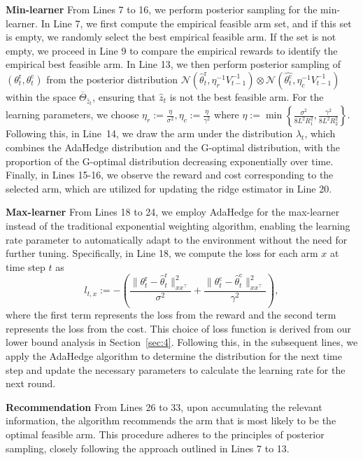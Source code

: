 \documentclass[accepted]{uai2025} %
\theoremstyle{plain}
\theoremstyle{definition}
\theoremstyle{remark}
\newcommand{\thetac}{\theta^{\mathrm{c}}}
\newcommand{\thetar}{\theta^{\mathrm{r}}}
\newcommand{\cbr}[1]{\left\{#1\right\}}
\begin{document}
\textbf{Min-learner}
From Lines 7 to 16, we perform posterior sampling for the min-learner. In Line 7, we first compute the empirical feasible arm set, and if this set is empty, we randomly select the best empirical feasible arm. If the set is not empty, we proceed in Line 9 to compare the empirical rewards to identify the empirical best feasible arm. In Line 13, we then perform posterior sampling of $(\thetar_t, \thetac_t)$ from the posterior distribution $\mathcal{N}(\hat{\theta}^{\mathrm{r}}_t, \eta_r^{-1} V_{t-1}^{-1}) \otimes \mathcal{N}(\hat{\thetac_t}, \eta_c^{-1} V_{t-1}^{-1})$ within the space $\overline{\Theta}_{\hat{z}_t}$, ensuring that $\hat{z}_t$ is not the best feasible arm. For the learning parameters, we choose $\eta_r:=\frac{\eta}{\sigma^2},\eta_c:=\frac{\eta}{\gamma^2}$ where $\eta:=\min \cbr{\frac{\sigma^2}{8L^2R_1^2},\frac{\gamma^2}{8L^2R_2^2}}.$
Following this, in Line~14, we draw the arm under the distribution $\lambda_t$, which combines the AdaHedge distribution and the G-optimal distribution, with the proportion of the G-optimal distribution decreasing exponentially over time. Finally, in Lines 15-16, we observe the reward and cost corresponding to the selected arm, which are utilized for updating the ridge estimator in Line 20.

\textbf{Max-learner}
From Lines 18 to 24, we employ AdaHedge for the max-learner instead of the traditional exponential weighting algorithm, enabling the learning rate parameter to automatically adapt to the environment without the need for further tuning. Specifically, in Line 18, we compute the loss for each arm \( x \) at time step \( t \) as 
$$
l_{t, x} := -\left(\frac{\lVert \thetar_t - \hat{\theta}^{\mathrm{r}}_t \rVert^2_{x x^\top}}{\sigma^2} + \frac{\lVert \thetac_t - \hat{\theta}^{\mathrm{c}}_t \rVert^2_{x x^\top}}{\gamma^2}\right),
$$
where the first term represents the loss from the reward and the second term represents the loss from the cost. This choice of loss function is derived from our lower bound analysis in Section~\ref{sec:4}. Following this, in the subsequent lines, we apply the AdaHedge algorithm to determine the distribution for the next time step and update the necessary parameters to calculate the learning rate for the next round.


\textbf{Recommendation}
From Lines 26 to 33, upon accumulating the relevant information, the algorithm recommends the arm that is most likely to be the optimal feasible arm. This procedure adheres to the principles of posterior sampling, closely following the approach outlined in Lines 7 to 13.
\end{document}
